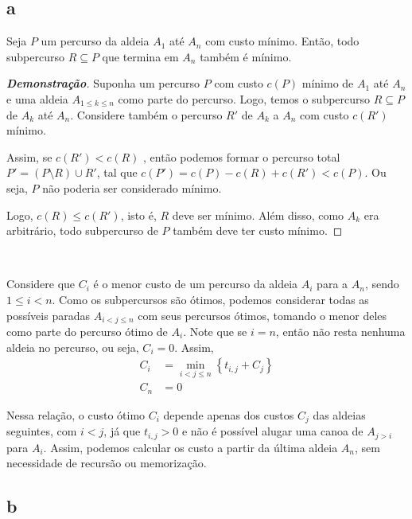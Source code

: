 \subsection{a} \label{sec:2:a}

\begin{theorem}
    Seja $P$ um percurso da aldeia $A_1$ até $A_n$ com custo mínimo. Então, todo subpercurso $R \subseteq P$ que termina em $A_n$ também é mínimo.
\end{theorem}

\begin{proof}[\textbf{Demonstração}]
    Suponha um percurso $P$ com custo $c(P)$ mínimo de $A_1$ até $A_n$ e uma aldeia $A_{1 \leq k \leq n}$ como parte do percurso. Logo, temos o subpercurso $R \subseteq P$ de $A_k$ até $A_n$. Considere também o percurso $R'$ de $A_k$ a $A_n$ com custo $c\left(R'\right)$ mínimo.

    Assim, se $c\left(R'\right) < c(R)$ , então podemos formar o percurso total $P' = (P \setminus R) \cup R'$, tal que $c\left(P'\right) = c(P) - c(R) + c\left(R'\right) < c(P)$. Ou seja, $P$ não poderia ser considerado mínimo.

    Logo, $c(R) \leq c\left(R'\right)$, isto é, $R$ deve ser mínimo. Além disso, como $A_k$ era arbitrário, todo subpercurso de $P$ também deve ter custo mínimo.
\end{proof}

~

Considere que $C_i$ é o menor custo de um percurso da aldeia $A_i$ para a $A_n$, sendo $1 \leq i < n$. Como os subpercursos são ótimos, podemos considerar todas as possíveis paradas $A_{i < j \leq n}$ com seus percursos ótimos, tomando o menor deles como parte do percurso ótimo de $A_i$. Note que se $i = n$, então não resta nenhuma aldeia no percurso, ou seja, $C_i = 0$. Assim,
\begin{align*}
    C_i &= \min_{i < j \leq n}\left\{t_{i, j} + C_j\right\} \\
    C_n &= 0
\end{align*}

Nessa relação, o custo ótimo $C_i$ depende apenas dos custos $C_j$ das aldeias seguintes, com $i < j$, já que $t_{i, j} > 0$ e não é possível alugar uma canoa de $A_{j > i}$ para $A_i$. Assim, podemos calcular os custo a partir da última aldeia $A_n$, sem necessidade de recursão ou memorização.

\itemdsep
\subsection{b}

